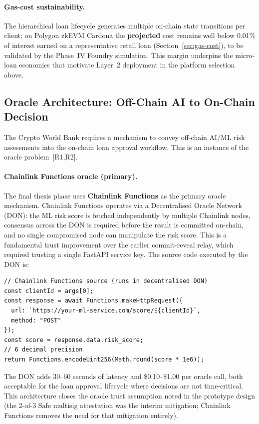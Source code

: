 \documentclass[12pt,a4paper]{report}
\begin{document}
\paragraph{Gas-cost sustainability.}
The hierarchical loan lifecycle generates multiple on-chain state transitions per client; on Polygon zkEVM Cardona the \textbf{projected} cost remains well below 0.01\% of interest earned on a representative retail loan (Section~\ref{sec:gas-cost}), to be validated by the Phase~IV Foundry simulation. This margin underpins the micro-loan economics that motivate Layer~2 deployment in the platform selection above.

\subsection{Oracle Architecture: Off-Chain AI to On-Chain Decision}
\label{sec:oracle-architecture}

The Crypto World Bank requires a mechanism to convey off-chain AI/ML risk assessments into the on-chain loan approval workflow. This is an instance of the oracle problem~[R1,R2].

\paragraph{Chainlink Functions oracle (primary).}
The final thesis phase uses \textbf{Chainlink Functions} as the primary oracle mechanism. Chainlink Functions operates via a Decentralised Oracle Network (DON): the ML risk score is fetched independently by multiple Chainlink nodes, consensus across the DON is required before the result is committed on-chain, and no single compromised node can manipulate the risk score. This is a fundamental trust improvement over the earlier commit-reveal relay, which required trusting a single FastAPI service key. The source code executed by the DON is:

\begin{verbatim}
// Chainlink Functions source (runs in decentralised DON)
const clientId = args[0];
const response = await Functions.makeHttpRequest({
  url: `https://your-ml-service.com/score/${clientId}`,
  method: "POST"
});
const score = response.data.risk_score;
// 6 decimal precision
return Functions.encodeUint256(Math.round(score * 1e6));
\end{verbatim}

The DON adds 30--60 seconds of latency and \$0.10--\$1.00 per oracle call, both acceptable for the loan approval lifecycle where decisions are not time-critical. This architecture closes the oracle trust assumption noted in the prototype design (the 2-of-3 Safe multisig attestation was the interim mitigation; Chainlink Functions removes the need for that mitigation entirely).
\end{document}
